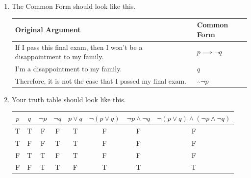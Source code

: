 \documentclass[letterpaper]{article}
\begin{document}
\begin{enumerate}
\begin{enumerate}
            $p \land c \equiv c$
            
            \item \textbf{De Morgan's laws}:
            
            $\neg (p \land q) \equiv \neg p \lor \neg q$

            $\neg(p \lor q) \equiv \neg p \land \neg q$
            
            \item \textbf{Absorption laws}:
            
            $p \land (p \lor q) \equiv p$

            $p \lor (p \land q) \equiv p$
            
            \item \textbf{Negations of $t$ and $c$}:
            
            $\neg t \equiv c$

            $\neg c \equiv t$
            
        \end{enumerate}

        
        \item The Common Form should look like this.
        
       \begin{tabular}{l|l}
            Original Argument & Common Form \\ \hline
            If I pass this final exam, then I won't be a disappointment to my family. & $p \implies \neg q$ \\
            I'm a disappointment to my family. & $q$\\
            Therefore, it is not the case that I passed my final exam. & $\therefore \neg p$\\
        \end{tabular}


        \item Your truth table should look like this.
        
        \begin{tabular}{|c|c|c|c|c|c|c|c|}
            \hline
            $p$ & $q$ & $\neg p$ & $\neg q$ & $p \lor q$ & $\neg (p \lor q)$ & $\neg p \land \neg q$ & $\neg (p \lor q) \land (\neg p \land \neg q)$\\ \hline
            T & T & F & F & T & F & F & F \\ \hline
            T & F & F & T & T & F & F & F \\ \hline
            F & T & T & F & T & F & F & F \\ \hline
            F & F & T & T & F & T & T & T \\ \hline
        \end{tabular}



\end{enumerate}
\end{document}
